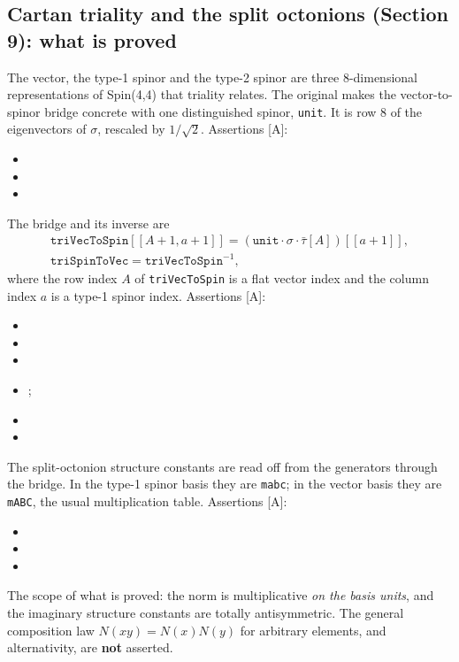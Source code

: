 \subsection{Cartan triality and the split octonions (Section 9): what is proved}
\label{fnd:triality}\label{sec:2.6}

The vector, the type-1 spinor and the type-2 spinor are three 8-dimensional representations of
Spin(4,4) that triality relates. The original makes the vector-to-spinor bridge concrete with
one distinguished spinor, \texttt{unit}. It is row 8 of the eigenvectors of $\sigma$, rescaled by
$1/\sqrt2$. Assertions [A]:
\begin{itemize}
  \item {}
  \item {}
  \item {}
\end{itemize}
The bridge and its inverse are
\begin{gather}
  \texttt{triVecToSpin}[[A+1,a+1]] = (\texttt{unit}\cdot\sigma\cdot\bar\tau[A])[[a+1]],\\
  \texttt{triSpinToVec}=\texttt{triVecToSpin}^{-1},
\end{gather}
where the row index $A$ of \texttt{triVecToSpin} is a flat vector index and the column index $a$
is a type-1 spinor index.
Assertions [A]:
\begin{itemize}
  \item {}
  \item {}
  \item {}
  \item {}; 
  \item {}
  \item {}
\end{itemize}
The split-octonion structure constants are read off from the generators through the bridge. In
the type-1 spinor basis they are \texttt{mabc}; in the vector basis they are \texttt{mABC}, the
usual multiplication table. Assertions [A]:
\begin{itemize}
  \item {}
  \item {}
  \item {}
\end{itemize}
The scope of what is proved: the norm is multiplicative \emph{on the basis units}, and the
imaginary structure constants are totally antisymmetric. The general composition law
$N(xy)=N(x)N(y)$ for arbitrary elements, and alternativity, are \textbf{not} asserted.

